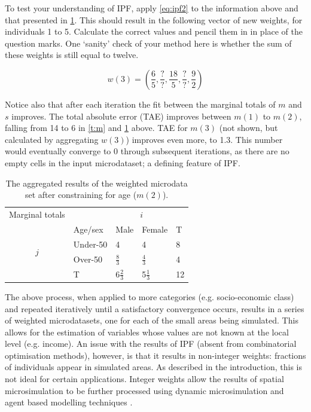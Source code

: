 \documentclass[a4paper, 11pt, twoside]{article}
\begin{document}
To test your understanding of IPF, apply \cref{eq:ipf2} to the information above
and that presented in \cref{t:m2}.
This should result in the following vector of new weights, for individuals 1 to
5. Calculate the correct values and pencil them in in place of the question
marks. One `sanity' check of your method here is whether the sum of these
weights is still equal to twelve. %

\begin{equation}
w(3) = (\frac{6}{5}, \frac{?}{?}, \frac{18}{5}, \frac{?}{?}, \frac{9}{2})
\end{equation}

Notice also that after each iteration the fit between the marginal
totals of $m$ and $s$
improves. The total absolute error (TAE) improves
between $m(1)$ to $m(2)$, falling from
14 to 6 in \cref{t:m} and \cref{t:m2} above. TAE for $m(3)$ (not shown,
but calculated by aggregating $w(3)$) improves even more, to 1.3.
This number would eventually converge to 0 through subsequent
iterations, as there are no empty cells in the input microdataset;
a defining feature of IPF.


\begin{table}[htbp]
\centering
\caption[Aggregated results after constraining for age]{The
aggregated results of the weighted
microdata set after constraining for age ($m(2)$).
}

\begin{tabular}{cllll}\toprule
Marginal totals&  & \multicolumn{2}{c}{$i$} & \\
& Age/sex & Male & Female & T\\ \midrule
\multirow{2}{*}{$j$} & Under-50 & 4 & 4 & 8\\
& Over-50 & $\frac{8}{3}$ & $\frac{4}{3}$ & 4 \\
& T & $6\frac{2}{3}$ & 5$\frac{1}{3}$ & 12\\
\bottomrule
\end{tabular}
\label{t:m2}
\end{table}

The above process, when applied to more categories (e.g. socio-economic class)
and repeated iteratively until a satisfactory convergence occurs, results in a
series of weighted microdatasets, one for each of the small areas being
simulated. This allows for the estimation of variables whose values are not
known at the local level (e.g. income). An issue
with the results of IPF (absent from combinatorial optimisation methods),
however, is that it results in non-integer weights: fractions of individuals
appear in simulated areas. As described in the introduction, this is not ideal
for certain applications. Integer weights allow the results of spatial
microsimulation to be further processed using dynamic microsimulation and agent
based modelling techniques \citep{Pritchard2012}.
\end{document}
